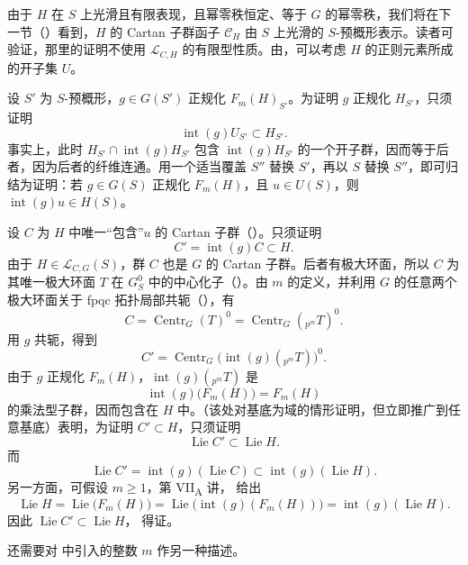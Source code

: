 由于 \(H\) 在 \(S\) 上光滑且有限表现，且幂零秩恒定、等于 \(G\) 的幂零秩，我们将在下一节（）看到，\(H\) 的 Cartan 子群函子 \(\mathcal C_H\) 由 \(S\) 上光滑的 \(S\)-预概形表示。读者可验证，那里的证明不使用 \(\mathcal L_{C,H}\) 的有限型性质。由，可以考虑 \(H\) 的正则元素所成的开子集 \(U\)。

设 \(S'\) 为 \(S\)-预概形，\(g\in G(S')\) 正规化 \(F_m(H)_{S'}\)。为证明 \(g\) 正规化 \(H_{S'}\)，只须证明
\[
\operatorname{int}(g)U_{S'}\subset H_{S'}.
\]
事实上，此时 \(H_{S'}\cap\operatorname{int}(g)H_{S'}\) 包含 \(\operatorname{int}(g)H_{S'}\) 的一个开子群，因而等于后者，因为后者的纤维连通。用一个适当覆盖 \(S''\) 替换 \(S'\)，再以 \(S\) 替换 \(S''\)，即可归结为证明：若 \(g\in G(S)\) 正规化 \(F_m(H)\)，且 \(u\in U(S)\)，则 \(\operatorname{int}(g)u\in H(S)\)。

设 \(C\) 为 \(H\) 中唯一“包含”\(u\) 的 Cartan 子群（）。只须证明
\[
C'=\operatorname{int}(g)C\subset H.
\]
由于 \(H\in\mathcal L_{C,G}(S)\)，群 \(C\) 也是 \(G\) 的 Cartan 子群。后者有极大环面，所以 \(C\) 为其唯一极大环面 \(T\) 在 \(G_S^0\) 中的中心化子（）。由 \(m\) 的定义，并利用 \(G\) 的任意两个极大环面关于 fpqc 拓扑局部共轭（），有
\[
C=\operatorname{Centr}_G(T)^0
 =\operatorname{Centr}_G({}_{p^m}T)^0.
\]
用 \(g\) 共轭，得到
\[
C'=\operatorname{Centr}_G\bigl(\operatorname{int}(g)({}_{p^m}T)\bigr)^0.
\]
由于 \(g\) 正规化 \(F_m(H)\)，\(\operatorname{int}(g)({}_{p^m}T)\) 是
\[
\operatorname{int}(g)\bigl(F_m(H)\bigr)=F_m(H)
\]
的乘法型子群，因而包含在 \(H\) 中。（该处对基底为域的情形证明，但立即推广到任意基底）表明，为证明 \(C'\subset H\)，只须证明
\[
\operatorname{Lie}C'\subset\operatorname{Lie}H.
\]
而
\[
\operatorname{Lie}C'
 =\operatorname{int}(g)(\operatorname{Lie}C)
 \subset\operatorname{int}(g)(\operatorname{Lie}H).
\]
另一方面，可假设 \(m\geq1\)，第 VII\textsubscript{A} 讲， 给出
\[
\operatorname{Lie}H
 =\operatorname{Lie}\bigl(F_m(H)\bigr)
 =\operatorname{Lie}\bigl(\operatorname{int}(g)(F_m(H))\bigr)
 =\operatorname{int}(g)(\operatorname{Lie}H).
\]
因此 \(\operatorname{Lie}C'\subset\operatorname{Lie}H\)， 得证。

还需要对  中引入的整数 \(m\) 作另一种描述。

